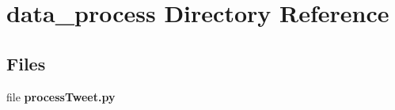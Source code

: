 \section{data\+\_\+process Directory Reference}
\label{dir_62b729fa5e8ddfb8d979d42ae6b750f9}
\subsection*{Files}
\begin{DoxyCompactItemize}
\item 
file {\bf process\+Tweet.\+py}
\end{DoxyCompactItemize}
